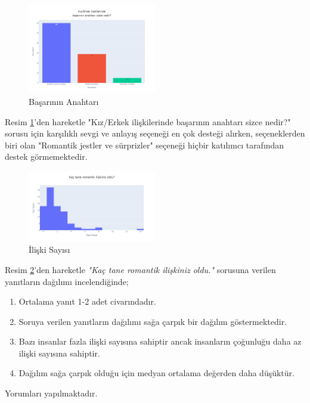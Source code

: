 \documentclass{article}
\begin{document}
\begin{twocolumn}
    \begin{figure}[htbp]
        \centering
        \includegraphics[width=0.5\textwidth]{Imgs/soru12.png}
        \caption{Başarının Anahtarı}
        \label{soru12}
    \end{figure}
Resim \ref{soru12}'den hareketle "Kız/Erkek ilişkilerinde başarının anahtarı sizce nedir?" sorusu için karşılıklı sevgi ve anlayış seçeneği en çok desteği alırken, seçeneklerden biri olan "Romantik jestler ve sürprizler" seçeneği hiçbir katılımcı tarafından destek görmemektedir.

    \begin{figure}[htbp]
        \centering
        \includegraphics[width=0.5\textwidth]{Imgs/soru13.png}
        \caption{İlişki Sayısı}
        \label{soru13}
    \end{figure}
\newpage
Resim \ref{soru13}'den hareketle \textit{"Kaç tane romantik ilişkiniz oldu."} sorusuna verilen yanıtların dağılımı incelendiğinde;
\begin{enumerate}
    \item Ortalama yanıt 1-2 adet civarındadır.
    \item Soruya verilen yanıtların dağılımı sağa çarpık bir dağılım göstermektedir.
    \item Bazı insanlar fazla ilişki sayısına sahiptir ancak insanların çoğunluğu daha az ilişki sayısına sahiptir.
    \item Dağılım sağa çarpık olduğu için medyan ortalama değerden daha düşüktür.
\end{enumerate}
Yorumları yapılmaktadır.

\end{twocolumn}
\end{document}
